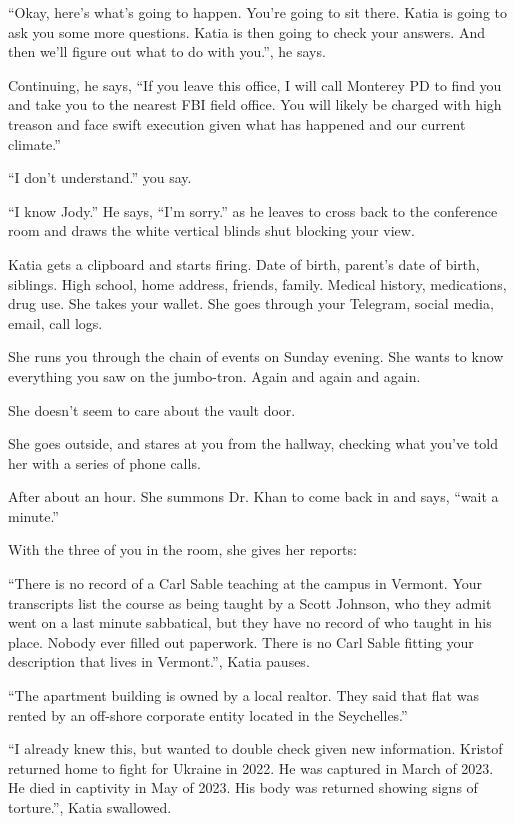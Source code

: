 \documentclass[17pt, twoside, a5paper, openright, extrafontsizes]{memoir}
\begin{document}
``Okay, here's what's going to happen. You're going to sit there. Katia
is going to ask you some more questions. Katia is then going to check
your answers. And then we'll figure out what to do with you.'', he says.

Continuing, he says, ``If you leave this office, I will call Monterey PD
to find you and take you to the nearest FBI field office. You will
likely be charged with high treason and face swift execution given what
has happened and our current climate.''

``I don't understand.'' you say.

``I know Jody.'' He says, ``I'm sorry.'' as he leaves to cross back to
the conference room and draws the white vertical blinds shut blocking
your view.

Katia gets a clipboard and starts firing. Date of birth, parent's date
of birth, siblings. High school, home address, friends, family. Medical
history, medications, drug use. She takes your wallet. She goes through
your Telegram, social media, email, call logs.

She runs you through the chain of events on Sunday evening. She wants to
know everything you saw on the jumbo-tron. Again and again and again.

She doesn't seem to care about the vault door.

She goes outside, and stares at you from the hallway, checking what
you've told her with a series of phone calls.

After about an hour. She summons Dr. Khan to come back in and says,
``wait a minute.''

With the three of you in the room, she gives her reports:

``There is no record of a Carl Sable teaching at the campus in Vermont.
Your transcripts list the course as being taught by a Scott Johnson, who
they admit went on a last minute sabbatical, but they have no record of
who taught in his place. Nobody ever filled out paperwork. There is no
Carl Sable fitting your description that lives in Vermont.'', Katia
pauses.

``The apartment building is owned by a local realtor. They said that
flat was rented by an off-shore corporate entity located in the
Seychelles.''

``I already knew this, but wanted to double check given new information.
Kristof returned home to fight for Ukraine in 2022. He was captured in
March of 2023. He died in captivity in May of 2023. His body was
returned showing signs of torture.'', Katia swallowed.
\end{document}
